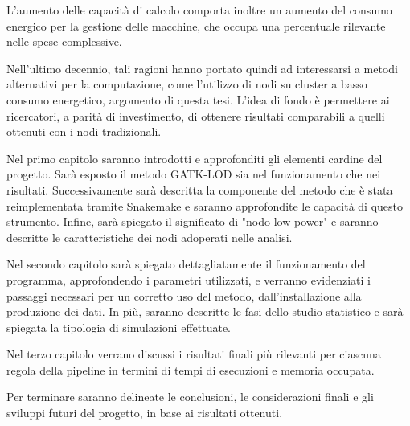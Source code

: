 \documentclass[12pt, a4paper]{report}
\begin{document}
L'aumento delle capacità di calcolo comporta inoltre un aumento del consumo energico per la gestione delle macchine, che occupa una percentuale rilevante nelle spese complessive.

Nell'ultimo decennio, tali ragioni hanno portato quindi ad interessarsi a metodi alternativi per la computazione, come l'utilizzo di nodi su cluster a basso consumo energetico, argomento di questa tesi.
L'idea di fondo è permettere ai ricercatori, a parità di investimento, di ottenere risultati comparabili a quelli ottenuti con i nodi tradizionali.

Nel primo capitolo saranno introdotti e approfonditi gli elementi cardine del progetto. Sarà esposto il metodo GATK-LOD sia nel funzionamento che nei risultati. 
Successivamente sarà descritta la componente del metodo che è stata reimplementata tramite Snakemake e saranno approfondite le capacità di questo strumento.
Infine, sarà spiegato il significato di "nodo low power" e saranno descritte le caratteristiche dei nodi adoperati nelle analisi.

Nel secondo capitolo sarà spiegato dettagliatamente il funzionamento del programma, approfondendo i parametri utilizzati, e verranno evidenziati i passaggi necessari per un corretto uso del metodo, dall'installazione alla produzione dei dati.
In più, saranno descritte le fasi dello studio statistico e sarà spiegata la tipologia di simulazioni effettuate.

Nel terzo capitolo verrano discussi i risultati finali più rilevanti per ciascuna regola della pipeline in termini di tempi di esecuzioni e memoria occupata. 

Per terminare saranno delineate le conclusioni, le considerazioni finali e gli sviluppi futuri del progetto, in base ai risultati ottenuti.

\tableofcontents







\end{document}
